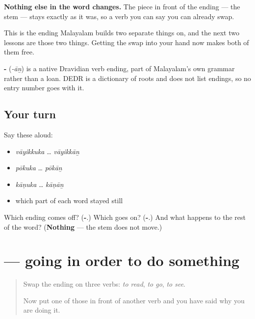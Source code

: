 \textbf{Nothing else in the word changes.} The piece in front of the ending — the stem — stays exactly as it was, so a verb you can say you can already swap.

This is the ending Malayalam builds two separate things on, and the next two lessons are those two things. Getting the swap into your hand now makes both of them free.

\begin{cousinweb}
\textbf{-} (\emph{-āṉ}) is a native Dravidian verb ending, part of Malayalam's own grammar rather than a loan. DEDR is a dictionary of roots and does not list endings, so no entry number goes with it.
\end{cousinweb}

\subsection*{Your turn}
Say these aloud:

\begin{itemize}
\raggedright
  \item \emph{vāyikkuka} … \emph{vāyikkāṉ}
  \item \emph{pōkuka} … \emph{pōkāṉ}
  \item \emph{kāṇuka} … \emph{kāṇāṉ}
  \item which part of each word stayed still
\end{itemize}

\begin{tcolorbox}[breakable,colback=teal!4,colframe=teal!35!black,title={Before you move on}]
Which ending comes off? (\textbf{-}.) Which goes on? (\textbf{-}.) And what happens to the rest of the word? (\textbf{Nothing} — the stem does not move.)
\end{tcolorbox}
\section[\texorpdfstring{\ml{വായിക്കാൻ} \ml{പോകുന്നു} (vāyikkāṉ pōkunnu)}{വായിക്കാൻ പോകുന്നു (vāyikkāṉ pōkunnu)}]{  — going in order to do something}

\label{lesson:ML-C74-purpose}



\begin{quote}
Swap the ending on three verbs: \emph{to read}, \emph{to go}, \emph{to see}.

Now put one of those in front of another verb and you have said why you are doing it.
\end{quote}

